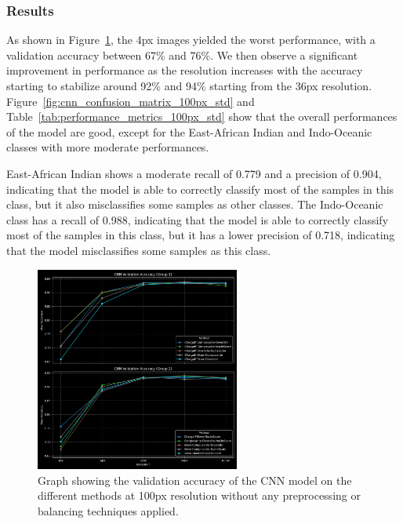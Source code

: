 \subsubsection{Results}
\label{subsubsec:results_initial_testing}

As shown in Figure~\ref{fig:cnn_validation_accuracy_std}, the 4px images yielded the worst performance, with a validation accuracy between 67\%
and 76\%. We then observe a significant improvement in performance as the resolution increases with the accuracy starting to stabilize
around 92\% and 94\% starting from the 36px resolution. Figure~\ref{fig:cnn_confusion_matrix_100px_std} and Table~\ref{tab:performance_metrics_100px_std}
show that the overall performances of the model are good, except for the East-African Indian and Indo-Oceanic classes with more moderate performances.

East-African Indian shows a moderate recall of 0.779 and a precision of 0.904, indicating that the model is able to correctly classify
most of the samples in this class, but it also misclassifies some samples as other classes. The Indo-Oceanic class has a recall of 0.988,
indicating that the model is able to correctly classify most of the samples in this class, but it has a lower precision of 0.718, indicating
that the model misclassifies some samples as this class.

\begin{figure}[H]
	\centering
	\includegraphics[width=0.6\textwidth]{../imgs/graphs/standard/cnn_validation_accuracy_groups_mask_5_std.png}
	\caption{Graph showing the validation accuracy of the CNN model on the different methods at 100px resolution without any preprocessing or
		balancing techniques applied.}
	\label{fig:cnn_validation_accuracy_std}
\end{figure}

